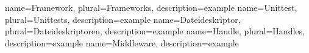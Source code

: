 \makeglossaries 

{
	name={Framework},  
	plural={Frameworks},
	description={example}
}  
{
	name={Unittest},  
	plural={Unittests},
	description={example}
}  
{
	name={Dateideskriptor},  
	plural={Dateideskriptoren},
	description={example}
}  
{
	name={Handle},  
	plural={Handles},
	description={example}
} 
{
	name={Middleware},  
	description={example}
} 